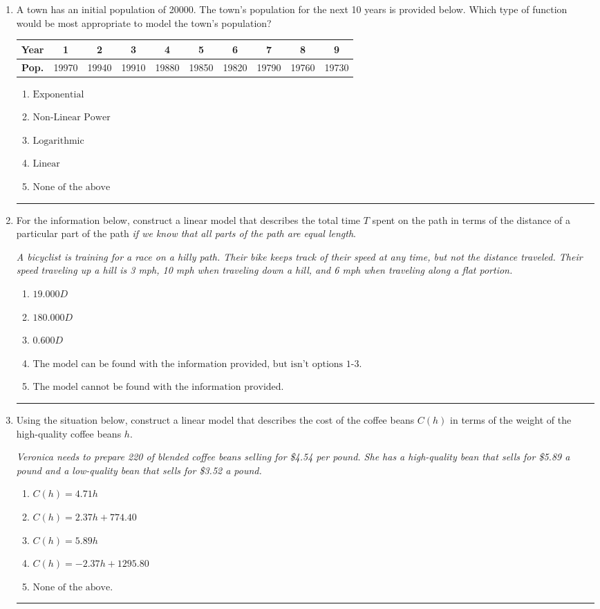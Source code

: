 \documentclass[14pt]{extbook}
\newcommand{\litem}[1]{\item#1\hspace*{-1cm}\rule{\textwidth}{0.4pt}}
\begin{document}
\begin{enumerate}
{\begin{enumerate}[label=\Alph*.]
\end{enumerate} }
\litem{
A town has an initial population of 20000. The town's population for the next 10 years is provided below. Which type of function would be most appropriate to model the town's population?


\begin{tabular}{c|c|c|c|c|c|c|c|c|c}
\textbf{Year} & 1 & 2 & 3 & 4 & 5 & 6 & 7 & 8 & 9 \tabularnewline
\hline
\textbf{Pop.} & 19970 & 19940 & 19910 & 19880 & 19850 & 19820 & 19790 & 19760 & 19730
\end{tabular} \begin{enumerate}[label=\Alph*.]
\item \( \text{Exponential} \)
\item \( \text{Non-Linear Power} \)
\item \( \text{Logarithmic} \)
\item \( \text{Linear} \)
\item \( \text{None of the above} \)

\end{enumerate} }
\litem{
For the information below, construct a linear model that describes the total time $T$ spent on the path in terms of the distance of a particular part of the path \textit{if we know that all parts of the path are equal length}.
\begin{center}
    \textit{ A bicyclist is training for a race on a hilly path. Their bike keeps track of their speed at any time, but not the distance traveled. Their speed traveling up a hill is 3 mph, 10 mph when traveling down a hill, and 6 mph when traveling along a flat portion. }
\end{center}
\begin{enumerate}[label=\Alph*.]
\item \( 19.000 D \)
\item \( 180.000 D \)
\item \( 0.600 D \)
\item \( \text{The model can be found with the information provided, but isn't options 1-3.} \)
\item \( \text{The model cannot be found with the information provided.} \)

\end{enumerate} }
\litem{
Using the situation below, construct a linear model that describes the cost of the coffee beans $C(h)$ in terms of the weight of the high-quality coffee beans $h$.
\begin{center}
    \textit{ Veronica needs to prepare 220 of blended coffee beans selling for \$4.54 per pound. She has a high-quality bean that sells for \$5.89 a pound and a low-quality bean that sells for \$3.52 a pound. }
\end{center}
\begin{enumerate}[label=\Alph*.]
\item \( C(h) = 4.71 h \)
\item \( C(h) = 2.37 h + 774.40 \)
\item \( C(h) = 5.89 h \)
\item \( C(h) = -2.37 h + 1295.80 \)
\item \( \text{None of the above.} \)


\end{enumerate}}
\end{enumerate}
\end{document}
